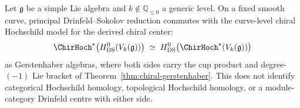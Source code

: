 \begin{conjecture}
\label{conj:ds-derived-center-commute}
Let $\mathfrak{g}$ be a simple Lie algebra and
$k \notin \mathbb{Q}_{\le 0}$ a generic level.
On a fixed smooth curve, principal Drinfeld--Sokolov reduction
commutes with the curve-level chiral Hochschild model for the
derived chiral center:
\begin{equation}\label{eq:ds-derived-center-commute}
 \ChirHoch^*\bigl(H^0_{\mathrm{DS}}(V_k(\mathfrak{g}))\bigr)
 \;\simeq\;
 H^0_{\mathrm{DS}}\bigl(\ChirHoch^*(V_k(\mathfrak{g}))\bigr)
\end{equation}
as Gerstenhaber algebras, where both sides carry the cup product
and degree-$(-1)$ Lie bracket of
Theorem~\ref{thm:chiral-gerstenhaber}. This does not identify
categorical Hochschild homology, topological Hochschild homology, or
a module-category Drinfeld centre with either side.
\end{conjecture}

